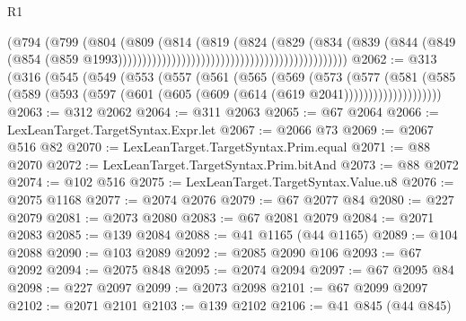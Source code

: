 \begin{lexlean}{R1}
\begin{coremodule}
{{{{{{{{{{{{{{{{{{{{{{{{{{{{{{{{{{{{{{{{                                                                      (@794
                                                                        (@799
                                                                          (@804
                                                                            (@809
                                                                              (@814
                                                                                (@819
                                                                                  (@824
                                                                                    (@829
                                                                                      (@834
                                                                                        (@839
                                                                                          (@844
                                                                                            (@849
                                                                                              (@854
                                                                                                (@859
                                                                                                  @1993)))))))))))))))))))))))))))))))))))))))))))))))
@2062 := @313
    (@316
      (@545
        (@549
          (@553
            (@557
              (@561
                (@565
                  (@569
                    (@573
                      (@577
                        (@581
                          (@585
                            (@589
                              (@593 (@597 (@601 (@605 (@609 (@614 (@619 @2041))))))))))))))))))))
@2063 := @312 @2062
@2064 := @311 @2063
@2065 := @67 @2064
@2066 := LexLeanTarget.TargetSyntax.Expr.let
@2067 := @2066 @73
@2069 := @2067 @516 @82
@2070 := LexLeanTarget.TargetSyntax.Prim.equal
@2071 := @88 @2070
@2072 := LexLeanTarget.TargetSyntax.Prim.bitAnd
@2073 := @88 @2072
@2074 := @102 @516
@2075 := LexLeanTarget.TargetSyntax.Value.u8
@2076 := @2075 @1168
@2077 := @2074 @2076
@2079 := @67 @2077 @84
@2080 := @227 @2079
@2081 := @2073 @2080
@2083 := @67 @2081 @2079
@2084 := @2071 @2083
@2085 := @139 @2084
@2088 := @41 @1165 (@44 @1165)
@2089 := @104 @2088
@2090 := @103 @2089
@2092 := @2085 @2090 @106
@2093 := @67 @2092
@2094 := @2075 @848
@2095 := @2074 @2094
@2097 := @67 @2095 @84
@2098 := @227 @2097
@2099 := @2073 @2098
@2101 := @67 @2099 @2097
@2102 := @2071 @2101
@2103 := @139 @2102
@2106 := @41 @845 (@44 @845)
}}}}}}}}}}}}}}}}}}}}}}}}}}}}}}}}}}}}}}}}
\end{coremodule}
\end{lexlean}
